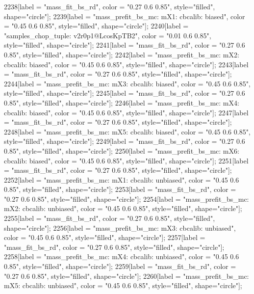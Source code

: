 {	2238[label = "mass_fit_bs_rd", color = "0.27 0.6 0.85", style="filled", shape="circle"];
	2239[label = "mass_prefit_bs_mc\nmassbin: mX1\nmassmodel: cbcalib\ntrigger: biased", color = "0.45 0.6 0.85", style="filled", shape="circle"];
	2240[label = "samples_chop_tuple\nversion: v2r0p1@LcosKpTB2", color = "0.01 0.6 0.85", style="filled", shape="circle"];
	2241[label = "mass_fit_bs_rd", color = "0.27 0.6 0.85", style="filled", shape="circle"];
	2242[label = "mass_prefit_bs_mc\nmassbin: mX2\nmassmodel: cbcalib\ntrigger: biased", color = "0.45 0.6 0.85", style="filled", shape="circle"];
	2243[label = "mass_fit_bs_rd", color = "0.27 0.6 0.85", style="filled", shape="circle"];
	2244[label = "mass_prefit_bs_mc\nmassbin: mX3\nmassmodel: cbcalib\ntrigger: biased", color = "0.45 0.6 0.85", style="filled", shape="circle"];
	2245[label = "mass_fit_bs_rd", color = "0.27 0.6 0.85", style="filled", shape="circle"];
	2246[label = "mass_prefit_bs_mc\nmassbin: mX4\nmassmodel: cbcalib\ntrigger: biased", color = "0.45 0.6 0.85", style="filled", shape="circle"];
	2247[label = "mass_fit_bs_rd", color = "0.27 0.6 0.85", style="filled", shape="circle"];
	2248[label = "mass_prefit_bs_mc\nmassbin: mX5\nmassmodel: cbcalib\ntrigger: biased", color = "0.45 0.6 0.85", style="filled", shape="circle"];
	2249[label = "mass_fit_bs_rd", color = "0.27 0.6 0.85", style="filled", shape="circle"];
	2250[label = "mass_prefit_bs_mc\nmassbin: mX6\nmassmodel: cbcalib\ntrigger: biased", color = "0.45 0.6 0.85", style="filled", shape="circle"];
	2251[label = "mass_fit_bs_rd", color = "0.27 0.6 0.85", style="filled", shape="circle"];
	2252[label = "mass_prefit_bs_mc\nmassbin: mX1\nmassmodel: cbcalib\ntrigger: unbiased", color = "0.45 0.6 0.85", style="filled", shape="circle"];
	2253[label = "mass_fit_bs_rd", color = "0.27 0.6 0.85", style="filled", shape="circle"];
	2254[label = "mass_prefit_bs_mc\nmassbin: mX2\nmassmodel: cbcalib\ntrigger: unbiased", color = "0.45 0.6 0.85", style="filled", shape="circle"];
	2255[label = "mass_fit_bs_rd", color = "0.27 0.6 0.85", style="filled", shape="circle"];
	2256[label = "mass_prefit_bs_mc\nmassbin: mX3\nmassmodel: cbcalib\ntrigger: unbiased", color = "0.45 0.6 0.85", style="filled", shape="circle"];
	2257[label = "mass_fit_bs_rd", color = "0.27 0.6 0.85", style="filled", shape="circle"];
	2258[label = "mass_prefit_bs_mc\nmassbin: mX4\nmassmodel: cbcalib\ntrigger: unbiased", color = "0.45 0.6 0.85", style="filled", shape="circle"];
	2259[label = "mass_fit_bs_rd", color = "0.27 0.6 0.85", style="filled", shape="circle"];
	2260[label = "mass_prefit_bs_mc\nmassbin: mX5\nmassmodel: cbcalib\ntrigger: unbiased", color = "0.45 0.6 0.85", style="filled", shape="circle"];
}
